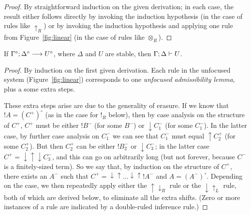\begin{proof}
  By straightforward induction on the given derivation; in each case,
  the result either follows directly by invoking the induction
  hypothesis (in the case of rules like ${\uparrow}_R$) or by invoking
  the induction hypothesis and applying one rule from
  Figure~\ref{fig:linear} (in the case of rules like ${\otimes}_R$).
\end{proof}

\begin{theorem}\label{thm:linfoccomplete}
If ${\Gamma^\circ};{\Delta^\circ} \longrightarrow {U^\circ} \mathstrut$, where $\Delta$ and $U$ are
stable,
then ${\Gamma};{\Delta} \vdash {U} \mathstrut$. 
\end{theorem}

\begin{proof}
  By induction on the first given derivation. Each rule in the
  unfocused system (Figure~\ref{fig:linear}) corresponds to one {\it
    unfocused admissibility lemma}, plus a some extra steps.

  These extra steps arise are due to the generality of erasure. If we
  know that ${!}A = (C^+)^\circ$ (as in the case for ${!}_R$ below),
  then by case analysis on the structure of $C^+$, $C^+$ must be
  either ${!}B^-$ (for some $B^-$) or ${\downarrow}C_1^-$ (for some
  $C_1^-$). In the latter case, by further case analysis on $C_1^-$ we
  can see that $C_1^-$ must equal ${\uparrow}C_2^+$ (for some
  $C_2^+$). But then $C_2^+$ can be either ${!}B_2^-$ or
  ${\downarrow}C_3^-$; in the latter case $C^+ =
  {\downarrow}{\uparrow}{\downarrow}C_3^-$, and this can go on
  arbitrarily long (but not forever, because $C^-$ is a finitely-sized
  term). So we say that, by induction on the structure of $C^+$, there
  exists an $A^-$ such that $C^+ =
  {\downarrow}{\uparrow}\ldots{\downarrow}{\uparrow}{!}A^-$ and $A =
  (A^-)^\circ$. Depending on the case, we then repeatedly apply either
  the ${\uparrow}{\downarrow}_R$ rule or the ${\downarrow}{\uparrow}_L$
  rule,
  both of which are derived below, to eliminate all the extra shifts.
  (Zero or more instances of a rule are indicated by a double-ruled
  inference rule.)


\end{proof}
